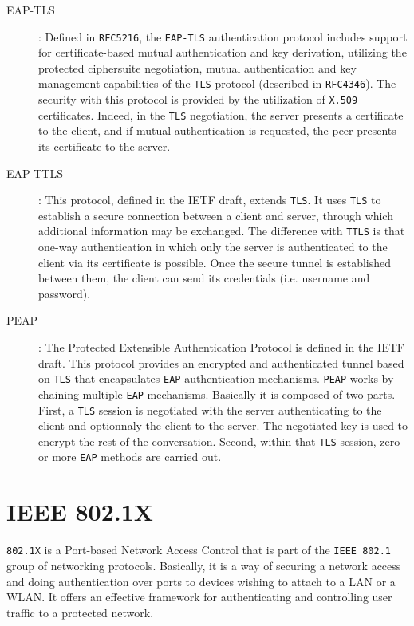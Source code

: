 \begin{description}
	\item [EAP-TLS]: Defined in \texttt{RFC5216}\cite{rfc5216}, the \texttt{EAP-TLS} authentication protocol includes support for certificate-based mutual authentication and key derivation, utilizing the protected ciphersuite negotiation, mutual authentication and key management capabilities of the \texttt{TLS} protocol (described in \texttt{RFC4346}\cite{rfc4346}). The security with this protocol is provided by the utilization of \texttt{X.509} certificates. Indeed, in the \texttt{TLS} negotiation, the server presents a certificate to the client, and if mutual authentication is requested, the peer presents its certificate to the server.
	\item [EAP-TTLS]: This protocol, defined in the IETF draft\cite{ttls-draft}, extends \texttt{TLS}. It uses \texttt{TLS} to establish a secure connection between a client and server, through which additional information may be exchanged. The difference with \texttt{TTLS} is that one-way authentication in which only the server is authenticated to the client via its certificate is possible. Once the secure tunnel is established between them, the client can send its credentials (i.e. username and password).
	\item [PEAP]: The Protected Extensible Authentication Protocol is defined in the IETF draft\cite{peap-draft}. This protocol provides an encrypted and authenticated tunnel based on \texttt{TLS} that encapsulates \texttt{EAP} authentication mechanisms. \texttt{PEAP} works by chaining multiple \texttt{EAP} mechanisms. Basically it is composed of two parts. First, a \texttt{TLS} session is negotiated with the server authenticating to the client and optionnaly the client to the server. The negotiated key is used to encrypt the rest of the conversation. Second, within that \texttt{TLS} session, zero or more \texttt{EAP} methods are carried out.
\end{description}


\section{IEEE 802.1X}
\texttt{802.1X} is a Port-based Network Access Control that is part of the \texttt{IEEE 802.1} group of networking protocols. Basically, it is a way of securing a network access and doing authentication over ports to devices wishing to attach to a LAN or a WLAN. It offers an effective framework for authenticating and controlling user traffic to a protected network.

